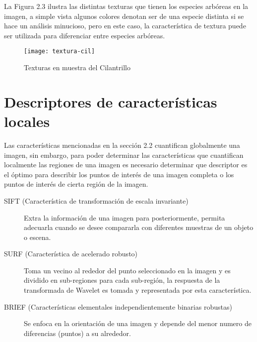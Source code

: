 La Figura 2.3 ilustra las distintas texturas que tienen los especies arbóreas en la imagen, a simple vista algunos colores denotan ser de una especie distinta si se hace un análisis minucioso, pero en este caso, la característica de textura puede ser utilizada para diferenciar entre especies arbóreas.
\vspace*{3\baselineskip}
\begin{figure}[h!]
  \centering
  \begin{minipage}[b]{1\textwidth}
    \texttt{[image: textura-cil]}
    \caption{Texturas en muestra del Cilantrillo}
  \end{minipage}
\end{figure}
\newpage
\section{Descriptores de características locales}
Las características mencionadas en la sección 2.2 cuantifican globalmente una imagen, sin embargo, para poder determinar las características que cuantifican localmente las regiones de una imagen es necesario determinar que descriptor es el óptimo para describir los puntos de interés de una imagen completa o los puntos de interés de cierta región de la imagen. 

\begin{description}
\item[SIFT (Característica de transformación de escala invariante)]{Extra la información de una imagen para posteriormente, permita adecuarla cuando se desee compararla con diferentes muestras de un objeto o escena.}
\end{description}

\begin{description}
\item[SURF (Característica de acelerado robusto)]{Toma un vecino al rededor del punto seleccionado en la imagen y es dividido en sub-regiones para cada sub-región, la respuesta de la transformada de Wavelet es tomada y representada por esta característica.}
\end{description}
 
\begin{description}
\item[BRIEF (Características elementales  independientemente binarias robustas)]{Se enfoca en la orientación de una imagen y depende del menor numero de diferencias (puntos) a su alrededor.}
\end{description}

